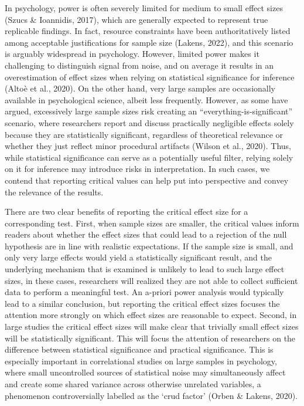 \documentclass[
  man]{apa7}
\begin{document}
In psychology, power is often severely limited for medium to small effect sizes (Szucs \& Ioannidis, 2017), which are generally expected to represent true replicable findings. In fact, resource constraints have been authoritatively listed among acceptable justifications for sample size (Lakens, 2022), and this scenario is arguably widespread in psychology. However, limited power makes it challenging to distinguish signal from noise, and on average it results in an overestimation of effect sizes when relying on statistical significance for inference (Altoè et al., 2020). On the other hand, very large samples are occasionally available in psychological science, albeit less frequently. However, as some have argued, excessively large sample sizes risk creating an ``everything-is-significant'' scenario, where researchers report and discuss practically negligible effects solely because they are statistically significant, regardless of theoretical relevance or whether they just reflect minor procedural artifacts (Wilson et al., 2020). Thus, while statistical significance can serve as a potentially useful filter, relying solely on it for inference may introduce risks in interpretation. In such cases, we contend that reporting critical values can help put into perspective and convey the relevance of the results.

There are two clear benefits of reporting the critical effect size for a corresponding test. First, when sample sizes are smaller, the critical values inform readers about whether the effect sizes that could lead to a rejection of the null hypothesis are in line with realistic expectations. If the sample size is small, and only very large effects would yield a statistically significant result, and the underlying mechanism that is examined is unlikely to lead to such large effect sizes, in these cases, researchers will realized they are not able to collect sufficient data to perform a meaningful test. An a-priori power analysis would typically lead to a similar conclusion, but reporting the critical effect sizes focuses the attention more strongly on which effect sizes are reasonable to expect. Second, in large studies the critical effect sizes will make clear that trivially small effect sizes will be statistically significant. This will focus the attention of researchers on the difference between statistical significance and practical significance. This is especially important in correlational studies on large samples in psychology, where small uncontrolled sources of statistical noise may simultaneously affect and create some shared variance across otherwise unrelated variables, a phenomenon controversially labelled as the `crud factor' (Orben \& Lakens, 2020).
\end{document}

